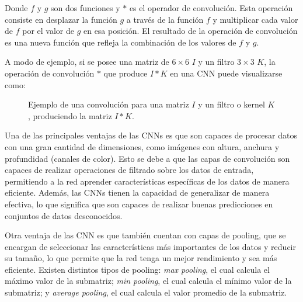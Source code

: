 Donde $f$ y $g$ son dos funciones y $*$ es el operador de convolución. Esta operación consiste en desplazar la función
$g$ a través de la función $f$ y multiplicar cada valor de $f$ por el valor de $g$ en esa posición. El resultado de la
operación de convolución es una nueva función que refleja la combinación de los valores de $f$ y $g$.

A modo de ejemplo, si se posee una matriz de $6\times6$ $I$ y un filtro $3\times3$ $K$, la operación de convolución $*$
que produce $I*K$ en una CNN puede visualizarse como:
\begin{figure}[H]
    \centering
    \caption{Ejemplo de una convolución para una matriz $I$ y un filtro o kernel $K$, produciendo la matriz $I*K$.}
    \label{fig:convolucion-ejemplo}
\end{figure}

Una de las principales ventajas de las CNNs es que son capaces de procesar datos con una gran cantidad de dimensiones,
como imágenes con altura, anchura y profundidad (canales de color). Esto se debe a que las capas de convolución son
capaces de realizar operaciones de filtrado sobre los datos de entrada, permitiendo a la red aprender características
específicas de los datos de manera eficiente. Además, las CNNs tienen la capacidad de generalizar de manera efectiva,
lo que significa que son capaces de realizar buenas predicciones en conjuntos de datos desconocidos.

Otra ventaja de las CNN es que también cuentan con capas de pooling, que se encargan de seleccionar las características
más importantes de los datos y reducir su tamaño, lo que permite que la red tenga un mejor rendimiento y sea más
eficiente. Existen distintos tipos de pooling: {\it max pooling}, el cual calcula el máximo valor de la submatriz; {\it
min pooling}, el cual calcula el mínimo valor de la submatriz; y {\it average pooling}, el cual calcula el valor
promedio de la submatriz.

